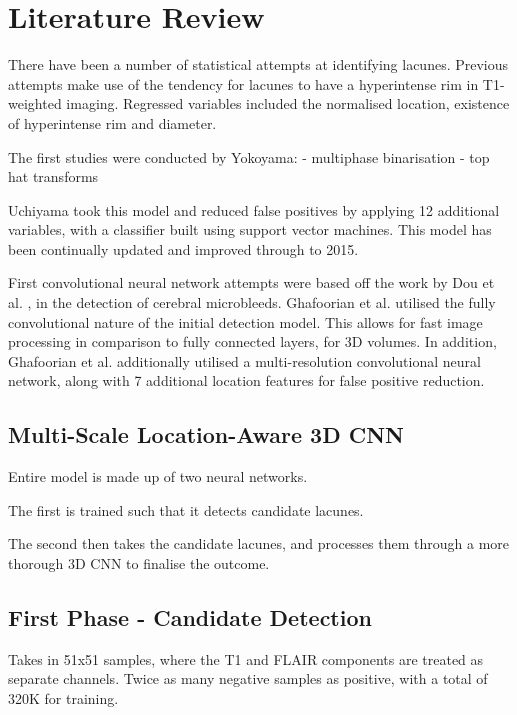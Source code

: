 \documentclass[honours,12pt]{unswthesis}
\numberwithin{equation}{section}
\begin{document}
\chapter{Literature Review}\label{litrev-intro}

{\noindent}There have been a number of statistical attempts at identifying lacunes. Previous attempts make use of the tendency for lacunes to have a hyperintense rim in T1-weighted imaging. Regressed variables included the normalised location, existence of hyperintense rim and diameter.





The first studies were conducted by Yokoyama:
 - multiphase binarisation
 - top hat transforms
 
 Uchiyama took this model and reduced false positives by applying 12 additional variables, with a classifier built using support vector machines. This model has been continually updated and improved through to 2015. 
 
First convolutional neural network attempts were based off the work by Dou et al. \cite{DouQ.2016ADoC}, in the detection of cerebral microbleeds. Ghafoorian et al. \cite{GhafoorianM.2017Dml3} utilised the fully convolutional nature of the initial detection model. This allows for fast image processing in comparison to fully connected layers, for 3D volumes. In addition, Ghafoorian et al. additionally utilised a multi-resolution convolutional neural network, along with 7 additional location features for false positive reduction.


\section{Multi-Scale Location-Aware 3D CNN}\label{litrev-paper1}

Entire model is made up of two neural networks.

The first is trained such that it detects candidate lacunes.

The second then takes the candidate lacunes, and processes them through a more thorough 3D CNN to finalise the outcome.

\section{First Phase - Candidate Detection}

Takes in 51x51 samples, where the T1 and FLAIR components are treated as separate channels. Twice as many negative samples as positive, with a total of 320K for training.
\end{document}

